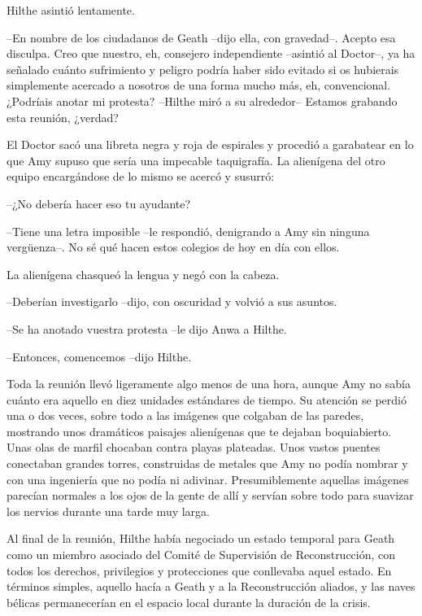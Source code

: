 {Hilthe asintió lentamente.}

{--En nombre de los ciudadanos de Geath --dijo ella, con gravedad--.
	Acepto esa disculpa. Creo que nuestro, eh, consejero independiente
	--asintió al Doctor--, ya ha señalado cuánto sufrimiento y peligro
	podría haber sido evitado si os hubierais simplemente acercado a
	nosotros de una forma mucho más, eh, convencional. ¿Podríais anotar mi
	protesta? --Hilthe miró a su alrededor-- Estamos grabando esta reunión,
¿verdad?}

{El Doctor sacó una libreta negra y roja de espirales y procedió a
	garabatear en lo que Amy supuso que sería una impecable taquigrafía. La
	alienígena del otro equipo encargándose de lo mismo se acercó y
susurró:}

{--¿No debería hacer eso tu ayudante?}

{--Tiene una letra imposible --le respondió, denigrando a Amy sin
	ninguna vergüenza--. No sé qué hacen estos colegios de hoy en día con
ellos.}

{La alienígena chasqueó la lengua y negó con la cabeza.}

{--Deberían investigarlo --dijo, con oscuridad y volvió a sus
asuntos.}

{--Se ha anotado vuestra protesta --le dijo Anwa a Hilthe.}

{--Entonces, comencemos --dijo Hilthe.}

{Toda la reunión llevó ligeramente algo menos de una hora, aunque Amy no
	sabía cuánto era aquello en diez unidades estándares de tiempo. Su
	atención se perdió una o dos veces, sobre todo a las imágenes que
	colgaban de las paredes, mostrando unos dramáticos paisajes alienígenas
	que te dejaban boquiabierto. Unas olas de marfil chocaban contra playas
	plateadas. Unos vastos puentes conectaban grandes torres, construidas de
	metales que Amy no podía nombrar y con una ingeniería que no podía ni
	adivinar. Presumiblemente aquellas imágenes parecían normales a los ojos
	de la gente de allí y servían sobre todo para suavizar los nervios
durante una tarde muy larga.}

{Al final de la reunión, Hilthe había negociado un estado temporal para
	Geath como un miembro asociado del Comité de Supervisión de
	Reconstrucción, con todos los derechos, privilegios y protecciones que
	conllevaba aquel estado. En términos simples, aquello hacía a Geath y a
	la Reconstrucción aliados, y las naves bélicas permanecerían en el
espacio local durante la duración de la crisis.}

